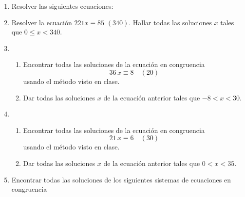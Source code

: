 \documentclass[a4paper,12pt,twoside,spanish,reqno]{amsbook}
\numberwithin{equation}{section}
\begin{document}
\begin{enumerate}
\item Resolver las siguientes ecuaciones:


\item Resolver la ecuaci\'on $221 x \equiv 85\,\, (340)$. Hallar todas las soluciones $x$ tales que $0 \le x < 340$.

\item 
\begin{enumerate}
    \item Encontrar todas las soluciones de la ecuaci\'on en congruencia
    $$36\,x\equiv 8 \quad (20)$$
    usando el método visto en clase.
    \item Dar todas las soluciones $x$ de la ecuaci\'on anterior tales que $-8 < x < 30$.
\end{enumerate}


\item 
\begin{enumerate}
\item Encontrar todas las soluciones de la ecuaci\'on en congruencia
$$21\,x\equiv 6 \quad (30)$$
usando el método visto en clase.
\item Dar todas las soluciones $x$ de la ecuaci\'on anterior tales que $0 < x < 35$.
\end{enumerate}




\item Encontrar todas las soluciones de los siguientes sistemas de ecuaciones en congruencia 
    

\end{enumerate}
\end{document}
